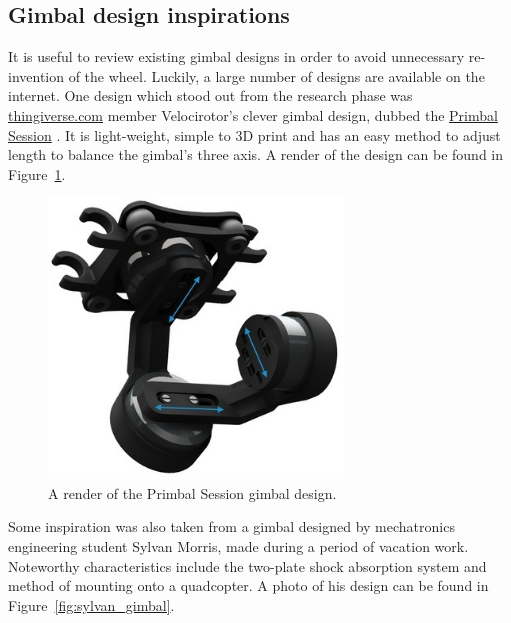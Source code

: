 \subsection{\label{ssec:gimbal_design_inspirations}Gimbal design inspirations}
It is useful to review existing gimbal designs in order to avoid unnecessary re-invention of the wheel. Luckily, a large number of designs are available on the internet. One design which stood out from the research phase was \href{https://www.thingiverse.com}{thingiverse.com} member Velocirotor's clever gimbal design, dubbed the \href{https://www.thingiverse.com/thing:2804872}{Primbal Session} \cite{website:primbal_session}. It is light-weight, simple to 3D print and has an easy method to adjust length to balance the gimbal's three axis. A render of the design can be found in Figure~\ref{fig:primbal_pic}.

\begin{figure}[h!]
  \centering
  \includegraphics[width=0.7\textwidth]{literature_review/primbal_pic.jpg}
  \caption{\label{fig:primbal_pic} A render of the Primbal Session gimbal design.}
\end{figure}

Some inspiration was also taken from a gimbal designed by mechatronics engineering student Sylvan Morris, made during a period of vacation work. Noteworthy characteristics include the two-plate shock absorption system and method of mounting onto a quadcopter. A photo of his design can be found in Figure~\ref{fig:sylvan_gimbal}.

